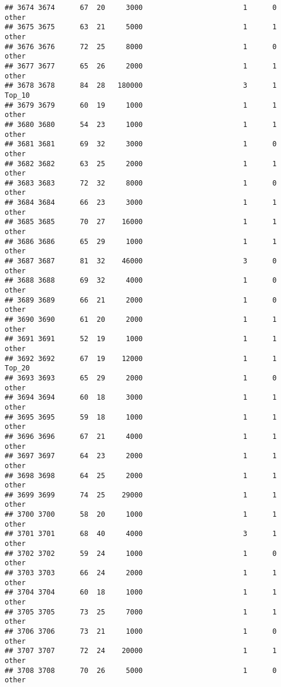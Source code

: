 \documentclass[
]{article}
\begin{document}
\begin{verbatim}
## 3674 3674      67  20     3000                        1      0    other
## 3675 3675      63  21     5000                        1      1    other
## 3676 3676      72  25     8000                        1      0    other
## 3677 3677      65  26     2000                        1      1    other
## 3678 3678      84  28   180000                        3      1   Top_10
## 3679 3679      60  19     1000                        1      1    other
## 3680 3680      54  23     1000                        1      1    other
## 3681 3681      69  32     3000                        1      0    other
## 3682 3682      63  25     2000                        1      1    other
## 3683 3683      72  32     8000                        1      0    other
## 3684 3684      66  23     3000                        1      1    other
## 3685 3685      70  27    16000                        1      1    other
## 3686 3686      65  29     1000                        1      1    other
## 3687 3687      81  32    46000                        3      0    other
## 3688 3688      69  32     4000                        1      0    other
## 3689 3689      66  21     2000                        1      0    other
## 3690 3690      61  20     2000                        1      1    other
## 3691 3691      52  19     1000                        1      1    other
## 3692 3692      67  19    12000                        1      1   Top_20
## 3693 3693      65  29     2000                        1      0    other
## 3694 3694      60  18     3000                        1      1    other
## 3695 3695      59  18     1000                        1      1    other
## 3696 3696      67  21     4000                        1      1    other
## 3697 3697      64  23     2000                        1      1    other
## 3698 3698      64  25     2000                        1      1    other
## 3699 3699      74  25    29000                        1      1    other
## 3700 3700      58  20     1000                        1      1    other
## 3701 3701      68  40     4000                        3      1    other
## 3702 3702      59  24     1000                        1      0    other
## 3703 3703      66  24     2000                        1      1    other
## 3704 3704      60  18     1000                        1      1    other
## 3705 3705      73  25     7000                        1      1    other
## 3706 3706      73  21     1000                        1      0    other
## 3707 3707      72  24    20000                        1      1    other
## 3708 3708      70  26     5000                        1      0    other

\end{verbatim}
\end{document}
